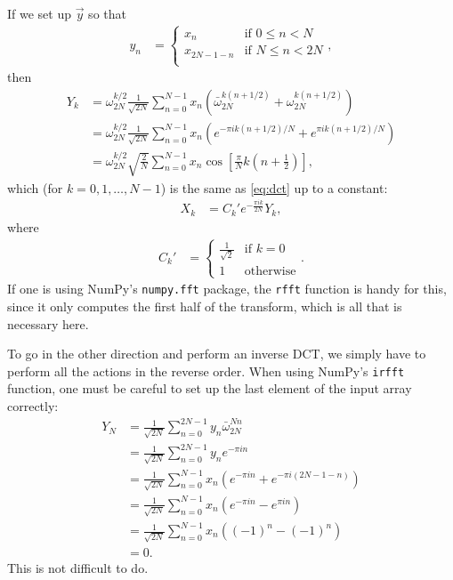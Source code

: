 If we set up $\vec{y}$ so that
\begin{align}
	y_n
	&= \begin{cases}
			x_n & \text{if } 0 \le n < N \\
			x_{2 N - 1 - n} & \text{if } N \le n < 2 N \\
		\end{cases},
\end{align}
then
\begin{subequations}
\begin{align}
	Y_k
	&= \omega_{2 N}^{k/2} \frac{1}{\sqrt{2 N}} \sum_{n=0}^{N - 1} x_n (\bar{\omega}_{2 N}^{k (n + 1/2)} + \omega_{2 N}^{k (n + 1/2)}) \\
	&= \omega_{2 N}^{k/2} \frac{1}{\sqrt{2 N}} \sum_{n=0}^{N - 1} x_n (e^{-\pi i k (n + 1/2) / N} + e^{\pi i k (n + 1/2) / N}) \\
	&= \omega_{2 N}^{k/2} \sqrt{\frac{2}{N}} \sum_{n=0}^{N - 1} x_n \cos{\left[ \frac{\pi}{N} k \left( n + \frac{1}{2} \right) \right]},
\end{align}
\end{subequations}
which (for $k = 0, 1, \ldots, N - 1$) is the same as \cref{eq:dct} up to a constant:
\begin{align}
	X_k
	&= C_k' e^{-\frac{\pi i k}{2 N}} Y_k,
\end{align}
where
\begin{align}
	C_k'
	&= \begin{cases}
			\frac{1}{\sqrt{2}} & \text{if } k = 0 \\
			1 & \text{otherwise}
		\end{cases}.
\end{align}
If one is using NumPy's \texttt{numpy.fft} package, the \texttt{rfft} function is handy for this, since it only computes the first half of the transform, which is all that is necessary here.

To go in the other direction and perform an inverse DCT, we simply have to perform all the actions in the reverse order.
When using NumPy's \texttt{irfft} function, one must be careful to set up the last element of the input array correctly:
\begin{subequations}
\begin{align}
	Y_N
	&= \frac{1}{\sqrt{2 N}} \sum_{n=0}^{2 N - 1} y_n \bar{\omega}_{2 N}^{N n} \\
	&= \frac{1}{\sqrt{2 N}} \sum_{n=0}^{2 N - 1} y_n e^{-\pi i n} \\
	&= \frac{1}{\sqrt{2 N}} \sum_{n=0}^{N - 1} x_n (e^{-\pi i n} + e^{-\pi i (2 N - 1 - n)}) \\
	&= \frac{1}{\sqrt{2 N}} \sum_{n=0}^{N - 1} x_n (e^{-\pi i n} - e^{\pi i n}) \\
	&= \frac{1}{\sqrt{2 N}} \sum_{n=0}^{N - 1} x_n ((-1)^n - (-1)^n) \\
	&= 0.
\end{align}
\end{subequations}
This is not difficult to do.
